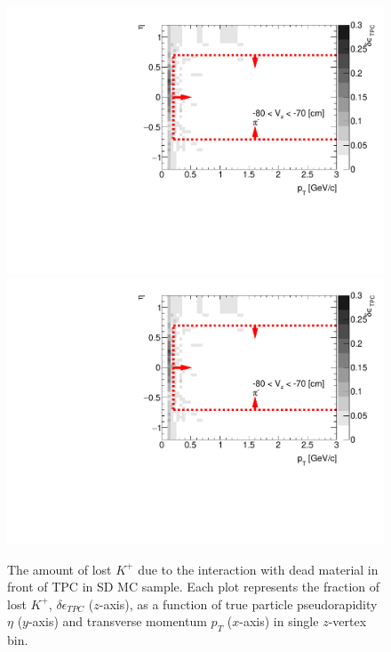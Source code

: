 \begin{figure}[H]
	\caption[The amount of lost $K^+$ due to the interaction with dead material in front of TPC as a function of $p_T$, $\eta$ and $z$-vertex in SD]{The amount of lost $K^+$ due to the interaction with dead material in front of TPC in SD MC sample. Each plot represents the fraction of lost $K^+$, $\delta\epsilon_{ TPC}$ ($z$-axis), as a function of true particle pseudorapidity $\eta$ ($y$-axis) and transverse momentum $p_{T}$ ($x$-axis) in single $z$-vertex bin.}\label{fig:dead_materialSD3DKp}
	\parbox{0.325\textwidth}{
		\includegraphics[width=\linewidth,page=65]{graphics/systematicsEfficiency/deadMaterial/secondaries_Unbinned_SD_.pdf}\\
		\includegraphics[width=\linewidth,page=68]{graphics/systematicsEfficiency/deadMaterial/secondaries_Unbinned_SD_.pdf}\\
}
\end{figure}

